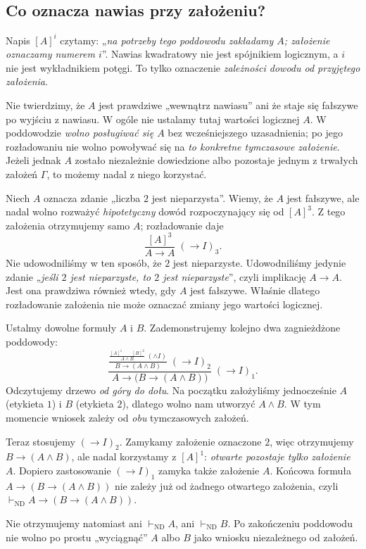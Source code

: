 \subsection{Co oznacza nawias przy założeniu?}\label{sec:nd-assumption-scope}
\begin{uwaga}\label{rem:nd-assumption-not-truth}
Napis $[A]^i$ czytamy: „\emph{na potrzeby tego poddowodu zakładamy $A$;
założenie oznaczamy numerem $i$}”. Nawias kwadratowy nie jest spójnikiem
logicznym, a $i$ nie jest wykładnikiem potęgi. To tylko oznaczenie
\emph{zależności dowodu od przyjętego założenia}.

Nie twierdzimy, że $A$ jest prawdziwe „wewnątrz nawiasu” ani że
staje się fałszywe po wyjściu z nawiasu. W ogóle nie ustalamy tutaj
wartości logicznej $A$. W poddowodzie \emph{wolno posługiwać się $A$}
bez wcześniejszego uzasadnienia; po jego rozładowaniu nie wolno
powoływać się na \emph{to konkretne tymczasowe założenie}.
Jeżeli jednak $A$ zostało niezależnie dowiedzione albo pozostaje
jednym z trwałych założeń $\Gamma$, to możemy nadal z niego korzystać.
\end{uwaga}

\begin{przyklad}\label{ex:nd-false-assumption}
Niech $A$ oznacza zdanie „liczba $2$ jest nieparzysta”.
Wiemy, że $A$ jest fałszywe, ale nadal wolno rozważyć
\emph{hipotetyczny} dowód rozpoczynający się od $[A]^3$.
Z tego założenia otrzymujemy samo $A$; rozładowanie daje
\[
\frac{[A]^3}{A\to A}\;(\to I)_3.
\]
Nie udowodniliśmy w ten sposób, że $2$ jest nieparzyste.
Udowodniliśmy jedynie zdanie „\emph{jeśli $2$ jest nieparzyste,
to $2$ jest nieparzyste}”, czyli implikację $A\to A$.
Jest ona prawdziwa również wtedy, gdy $A$ jest fałszywe.
Właśnie dlatego rozładowanie założenia nie może oznaczać
zmiany jego wartości logicznej.
\end{przyklad}

\begin{przyklad}\label{ex:nd-open-assumptions}
Ustalmy dowolne formuły $A$ i $B$.
Zademonstrujemy kolejno dwa zagnieżdżone poddowody:
\[
\frac{
 \displaystyle\frac{
   \displaystyle\frac{[A]^1\qquad[B]^2}{A\land B}\;(\land I)
 }{B\to(A\land B)}\;(\to I)_2
}{A\to\bigl(B\to(A\land B)\bigr)}\;(\to I)_1.
\]
Odczytujemy drzewo \emph{od góry do dołu}.
Na początku założyliśmy jednocześnie $A$ (etykieta $1$)
i $B$ (etykieta $2$), dlatego wolno nam utworzyć $A\land B$.
W tym momencie wniosek zależy od \emph{obu} tymczasowych założeń.

Teraz stosujemy $(\to I)_2$. Zamykamy założenie oznaczone $2$,
więc otrzymujemy $B\to(A\land B)$, ale nadal korzystamy z $[A]^1$:
\emph{otwarte pozostaje tylko założenie $A$}.
Dopiero zastosowanie $(\to I)_1$ zamyka także założenie $A$.
Końcowa formuła $A\to(B\to(A\land B))$ nie zależy już
od żadnego otwartego założenia, czyli
$\vdash_{\mathrm{ND}}A\to(B\to(A\land B))$.

Nie otrzymujemy natomiast ani $\vdash_{\mathrm{ND}}A$,
ani $\vdash_{\mathrm{ND}}B$. Po zakończeniu poddowodu
nie wolno po prostu „wyciągnąć” $A$ albo $B$ jako wniosku
niezależnego od założeń.
\end{przyklad}

